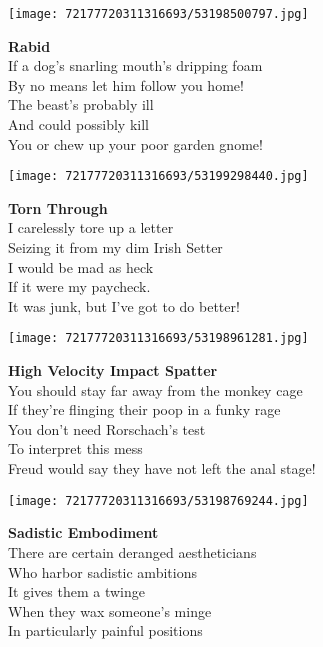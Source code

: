 \documentclass[10pt,letterpaper]{article}
\begin{document}
\begin{center}\texttt{[image: 72177720311316693/53198500797.jpg]}
\end{center}
\begin{center}
\textbf{Rabid}\\
\vskip 0.2in
If a dog's snarling mouth's dripping foam\\
By no means let him follow you home!\\
The beast's probably ill\\
And could possibly kill\\
You or chew up your poor garden gnome!\\
\end{center}
\pagebreak

\begin{center}\texttt{[image: 72177720311316693/53199298440.jpg]}
\end{center}
\begin{center}
\textbf{Torn Through}\\
\vskip 0.2in
I carelessly tore up a letter\\
Seizing it from my dim Irish Setter\\
I would be mad as heck\\
If it were my paycheck.\\
It was junk, but I've got to do better!\\
\end{center}
\pagebreak

\begin{center}
\texttt{[image: 72177720311316693/53198961281.jpg]}
\end{center}

\begin{center}
\textbf{High Velocity Impact Spatter}\\
\vskip 0.2in
You should stay far away from the monkey cage\\
If they're flinging their poop in a funky rage\\
You don't need Rorschach's test\\
To interpret this mess\\
Freud would say they have not left the anal stage!\\
\end{center}
\pagebreak

\begin{center}\texttt{[image: 72177720311316693/53198769244.jpg]}
\end{center}
\begin{center}
\textbf{Sadistic Embodiment}\\
\vskip 0.2in
There are certain deranged aestheticians\\
Who harbor sadistic ambitions\\
It gives them a twinge\\
When they wax someone's minge\\
In particularly painful positions\\
\end{center}
\pagebreak
\end{document}
